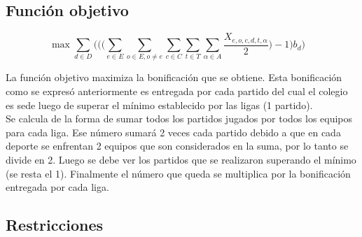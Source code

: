 \subsection{Función objetivo}

\begin{center}

	\[\max{\sum_{d \in D}\bigg(\Big(\big( \sum_{e \in E} \sum_{o \in E, o\neq e}\sum_{c \in C} \sum_{t \in T }\sum_{\alpha \in A}} {\frac{X_{e,o,c,d,t,\alpha}}{2}\big) - 1\Big)b_{d}}\bigg)\quad\]

\end{center}

\indent La función objetivo maximiza la bonificación que se obtiene. Esta bonificación como se expresó anteriormente es entregada por cada partido del cual el colegio es sede luego de superar el mínimo establecido por las ligas (1 partido).\\

\indent Se calcula de la forma de sumar todos los partidos jugados por todos los equipos para cada liga. Ese número sumará 2 veces cada partido debido a que en cada deporte se enfrentan 2 equipos que son considerados en la suma, por lo tanto se divide en 2. Luego se debe ver los partidos que se realizaron superando el mínimo (se resta el 1). Finalmente el número que queda se multiplica por la bonificación entregada por cada liga. 

\subsection{Restricciones}
\noindent 

